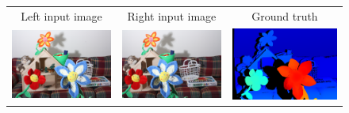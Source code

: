 \documentclass[twoside,11pt]{article}
\begin{document}
\begin{figure}[p]
\setlength\tabcolsep{2pt}
\begin{center}
\begin{tabular}{ccc}%
\rule{0pt}{4ex}Left input image &
Right input image &
Ground truth \\
\includegraphics[scale=0.5]{img/mb_7L_.png} &
\includegraphics[scale=0.5]{img/mb_7R_.png} &
\includegraphics[scale=0.5]{img/mb_7_2_gt_.png}\\
\end{tabular}


\end{center}
\end{figure}
\end{document}
